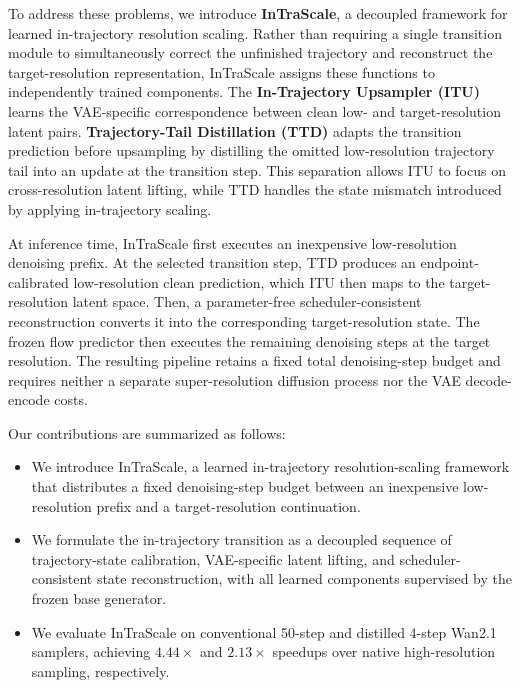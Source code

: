 \documentclass[letterpaper]{article} %
\begin{document}
To address these problems, we introduce \textbf{InTraScale}, a
decoupled framework for learned in-trajectory resolution scaling.
Rather than requiring a single transition module to simultaneously
correct the unfinished trajectory and reconstruct the
target-resolution representation, InTraScale assigns these functions
to independently trained components. The \textbf{In-Trajectory
Upsampler (ITU)} learns the VAE-specific correspondence between
clean low- and target-resolution latent pairs.
\textbf{Trajectory-Tail Distillation (TTD)} adapts the transition
prediction before upsampling by distilling the omitted
low-resolution trajectory tail into an update at the transition step. This
separation allows ITU to focus on cross-resolution latent lifting,
while TTD handles the state mismatch introduced by applying in-trajectory scaling.

At inference time, InTraScale first executes an inexpensive
low-resolution denoising prefix. At the selected transition step, TTD
produces an endpoint-calibrated low-resolution clean prediction, which
ITU then maps to the target-resolution latent space. Then, a parameter-free scheduler-consistent
reconstruction converts it into the corresponding target-resolution
state. The frozen flow predictor then
executes the remaining denoising steps at the target resolution. The
resulting pipeline retains a fixed total denoising-step budget and
requires neither a separate super-resolution diffusion process nor the
VAE decode-encode costs.


Our contributions are summarized as follows:
\begin{itemize}
  \item We introduce InTraScale, a learned in-trajectory resolution-scaling
  framework that distributes a fixed denoising-step budget between an
  inexpensive low-resolution prefix and a target-resolution continuation.

  \item We formulate the in-trajectory transition as a decoupled
sequence of trajectory-state calibration, VAE-specific latent lifting,
and scheduler-consistent state reconstruction, with all learned
components supervised by the frozen base generator.

  \item We evaluate InTraScale on conventional 50-step and distilled 4-step Wan2.1 samplers, achieving \(4.44\times\) and \(2.13\times\) speedups over native high-resolution sampling, respectively.
\end{itemize}
\end{document}
